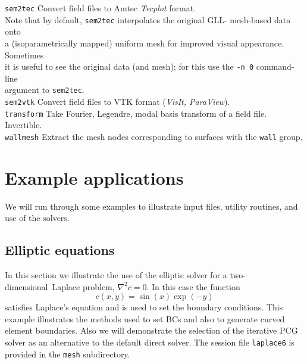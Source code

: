 \documentclass[11pt]{report}
\newcommand\twod{two-di\-men\-sion\-al}
\begin{document}
\begin{tabbing}
\texttt{sem2tec} \>   
        Convert field files to Amtec \emph{Tecplot} format.\\
        \> Note that by default, \verb|sem2tec| interpolates the original GLL-        mesh-based data onto \\
        \> a (isoparametrically mapped) uniform mesh for improved visual 
        appearance.  Sometimes\\ \>  it is useful to see the original data 
        (and mesh); for this use the \verb+-n 0+ command-line \\ 
         \> argument to \verb+sem2tec+.\\
\texttt{sem2vtk} \>   
        Convert field files to VTK format (\emph{VisIt, ParaView}).\\
\texttt{transform} \>      
        Take Fourier, Legendre, modal basis transform of a field
	file. Invertible.\\
\texttt{wallmesh} \>      
        Extract the mesh nodes corresponding to surfaces with the
	\verb+wall+ group.
\end{tabbing}


\chapter{Example applications}
\label{ch.examples}

We will run through some examples to illustrate input files, utility
routines, and use of the solvers.

\section{Elliptic equations}
\label{sec.laplace}

In this section we illustrate the use of the elliptic solver for a \twod\
Laplace problem, $\nabla^2 c = 0$.  In this case the function
\begin{equation}
  c(x,y) = \sin(x) \exp(-y)
\end{equation}
satisfies Laplace's equation and is used to set the boundary
conditions.  This example illustrates the methods used to set BCs and
also to generate curved element boundaries.  Also we will demonstrate
the selection of the iterative PCG solver as an alternative to the
default direct solver. The session file \texttt{laplace6} is provided
in the \verb|mesh| subdirectory.
\end{document}
